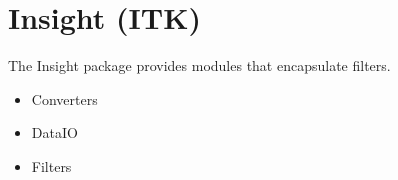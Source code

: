 \section{Insight (ITK)}
\label{sec:insightpackage}

The Insight package provides modules that encapsulate
 filters.

\begin{itemize}
\item Converters
\item DataIO
\item Filters
\end{itemize}



